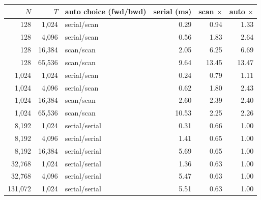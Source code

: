 \begin{tabular}{rrlrrr}
\toprule
$N$ & $T$ & auto choice (fwd/bwd) & serial (ms) & scan $\times$ & auto $\times$\\
\midrule
128 & 1{,}024 & serial/scan & 0.29 & 0.94 & 1.33\\
128 & 4{,}096 & serial/scan & 0.56 & 1.83 & 2.64\\
128 & 16{,}384 & scan/scan & 2.05 & 6.25 & 6.69\\
128 & 65{,}536 & scan/scan & 9.64 & 13.45 & 13.47\\
1{,}024 & 1{,}024 & serial/scan & 0.24 & 0.79 & 1.11\\
1{,}024 & 4{,}096 & serial/scan & 0.62 & 1.80 & 2.43\\
1{,}024 & 16{,}384 & scan/scan & 2.60 & 2.39 & 2.40\\
1{,}024 & 65{,}536 & scan/scan & 10.53 & 2.25 & 2.26\\
8{,}192 & 1{,}024 & serial/serial & 0.31 & 0.66 & 1.00\\
8{,}192 & 4{,}096 & serial/serial & 1.41 & 0.65 & 1.00\\
8{,}192 & 16{,}384 & serial/serial & 5.69 & 0.65 & 1.00\\
32{,}768 & 1{,}024 & serial/serial & 1.36 & 0.63 & 1.00\\
32{,}768 & 4{,}096 & serial/serial & 5.47 & 0.63 & 1.00\\
131{,}072 & 1{,}024 & serial/serial & 5.51 & 0.63 & 1.00\\
\bottomrule
\end{tabular}

